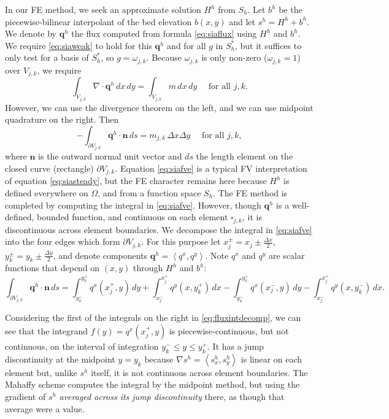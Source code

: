 \documentclass[11pt]{amsart}
\newcommand\bn{\mathbf{n}}
\newcommand\bq{\mathbf{q}}
\newcommand{\Div}{\nabla\cdot}
\newcommand{\grad}{\nabla}
\newcommand{\ip}[2]{\ensuremath{\left<#1,#2\right>}}
\newcommand{\dxtwo}{\tfrac{\Delta x}{2}}
\newcommand{\dytwo}{\tfrac{\Delta y}{2}}
\begin{document}
In our FE method, we seek an approximate solution $H^h$ from $S_h$.  Let $b^h$ be the piecewise-bilinear interpolant of the bed elevation $b(x,y)$ and let $s^h=H^h+b^h$.  We denote by $\bq^h$ the flux computed from formula \eqref{eq:siaflux} using $H^h$ and $b^h$.  We require \eqref{eq:siaweak} to hold for this $\bq^h$ and for all $g$ in $S_h^*$, but it suffices to only test for a basis of $S_h^*$, so $g=\omega_{j,k}$.  Because $\omega_{j,k}$ is only non-zero ($\omega_{j,k}=1$) over $V_{j,k}$, we require
\begin{equation}
  \int_{V_{j,k}} \Div \bq^h \,dx\,dy = \int_{V_{j,k}} m \,dx\,dy \quad \text{ for all } j,k.  \label{eq:siafve-transition}
\end{equation}
However, we can use the divergence theorem on the left, and we can use midpoint quadrature \cite{Elmanetal2005} on the right.  Then
\begin{equation}
  - \int_{\partial V_{j,k}} \bq^h \cdot \bn\,ds = m_{j,k}\, \Delta x \Delta y \quad \text{ for all } j,k, \label{eq:siafve}
\end{equation}
where $\bn$ is the outward normal unit vector and $ds$ the length element on the closed curve (rectangle) $\partial V_{j,k}$.  Equation \eqref{eq:siafve} is a typical FV interpretation of equation \eqref{eq:siasteady}, but the FE character remains here because $H^h$ is defined everywhere on $\Omega$, and from a function space $S_h$.  The FE method is completed by computing the integral in \eqref{eq:siafve}.  However, though $\bq^h$ is a well-defined, bounded function, and continuous on each element $\square_{j,k}$, it is discontinuous across element boundaries.  We decompose the integral in \eqref{eq:siafve} into the four edges which form $\partial V_{j,k}$.  For this purpose let $x_j^\pm = x_j \pm \dxtwo$, $y_k^\pm = y_k \pm \dytwo$, and denote components $\bq^h = \ip{q^x}{q^y}$.  Note $q^x$ and $q^y$ are scalar functions that depend on $(x,y)$ through $H^h$ and $b^h$:
\begin{equation}
  \int_{\partial V_{j,k}} \bq^h \cdot \bn\,ds = \int_{y_k^-}^{y_k^+} q^x(x_j^+,y)\,dy + \int_{x_j^-}^{x_j^+} q^y(x,y_k^+)\,dx - \int_{y_k^-}^{y_k^+} q^x(x_j^-,y)\,dy - \int_{x_j^-}^{x_j^+} q^y(x,y_k^-)\,dx. \label{eq:fluxintdecomp}
\end{equation}

Considering the first of the integrals on the right in \eqref{eq:fluxintdecomp}, we can see that the integrand $f(y) = q^x(x_j^+,y)$ is piecewise-continuous, but not continuous, on the interval of integration $y_k^- \le y \le y_k^+$.  It has a jump discontinuity at the midpoint $y=y_k$ because $\grad s^h = \ip{s^h_x}{s^h_y}$ is linear on each element but, unlike $s^h$ itself, it is not continuous across element boundaries.  The Mahaffy scheme computes the integral by the midpoint method, but using the gradient of $s^h$ \emph{averaged across its jump discontinuity} there, as though that average were a value.
\end{document}
